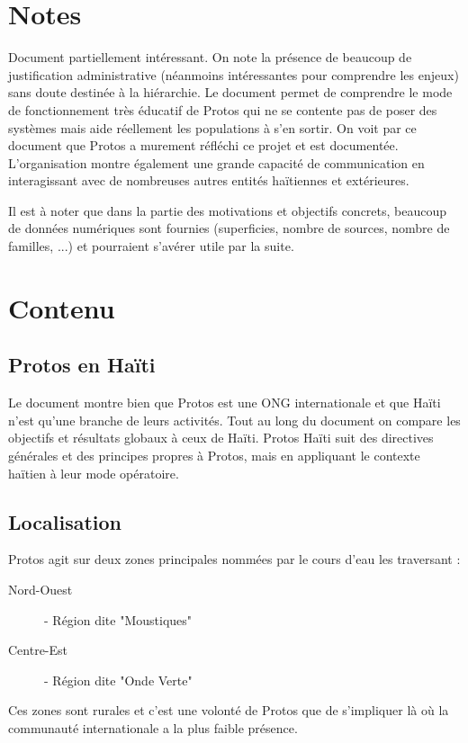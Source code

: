 \documentclass[a4paper, 11pt]{article}
\begin{document}
\section*{Notes}
Document partiellement intéressant. On note la présence de beaucoup de justification administrative (néanmoins intéressantes pour comprendre les enjeux) sans doute destinée à la hiérarchie. Le document permet de comprendre le mode de fonctionnement très éducatif de Protos qui ne se contente pas de poser des systèmes mais aide réellement les populations à s'en sortir. On voit par ce document que Protos a murement réfléchi ce projet et est documentée. L'organisation montre également une grande capacité de communication en interagissant avec de nombreuses autres entités haïtiennes et extérieures.

Il est à noter que dans la partie des motivations et objectifs concrets, beaucoup de données numériques sont fournies (superficies, nombre de sources, nombre de familles, ...) et pourraient s'avérer utile par la suite.

\section*{Contenu}

\subsection*{Protos en Haïti}
Le document montre bien que Protos est une ONG internationale et que Haïti n'est qu'une branche de leurs activités. Tout au long du document on compare les objectifs et résultats globaux à ceux de Haïti. Protos Haïti suit des directives générales et des principes propres à Protos, mais en appliquant le contexte haïtien à leur mode opératoire.

\subsection*{Localisation}
Protos agit sur deux zones principales nommées par le cours d'eau les traversant :
\begin{description}
  \item[Nord-Ouest] - Région dite "Moustiques"
  \item[Centre-Est] - Région dite "Onde Verte"
\end{description}
Ces zones sont rurales et c'est une volonté de Protos que de s'impliquer là où la communauté internationale a la plus faible présence.
\end{document}
